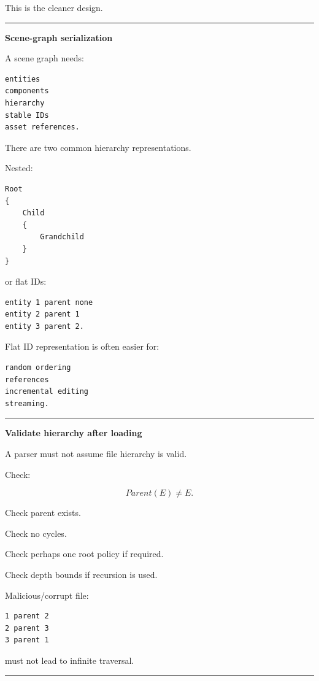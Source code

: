 This is the cleaner design.

\begin{center}\rule{0.5\linewidth}{0.5pt}\end{center}

\textbf{Scene-graph serialization}

A scene graph needs:

\begin{verbatim}
entities
components
hierarchy
stable IDs
asset references.
\end{verbatim}

There are two common hierarchy representations.

Nested:

\begin{verbatim}
Root
{
    Child
    {
        Grandchild
    }
}
\end{verbatim}

or flat IDs:

\begin{verbatim}
entity 1 parent none
entity 2 parent 1
entity 3 parent 2.
\end{verbatim}

Flat ID representation is often easier for:

\begin{verbatim}
random ordering
references
incremental editing
streaming.
\end{verbatim}

\begin{center}\rule{0.5\linewidth}{0.5pt}\end{center}

\textbf{Validate hierarchy after loading}

A parser must not assume file hierarchy is valid.

Check:

\[
Parent(E)\neq E.
\]

Check parent exists.

Check no cycles.

Check perhaps one root policy if required.

Check depth bounds if recursion is used.

Malicious/corrupt file:

\begin{verbatim}
1 parent 2
2 parent 3
3 parent 1
\end{verbatim}

must not lead to infinite traversal.

\begin{center}\rule{0.5\linewidth}{0.5pt}\end{center}

